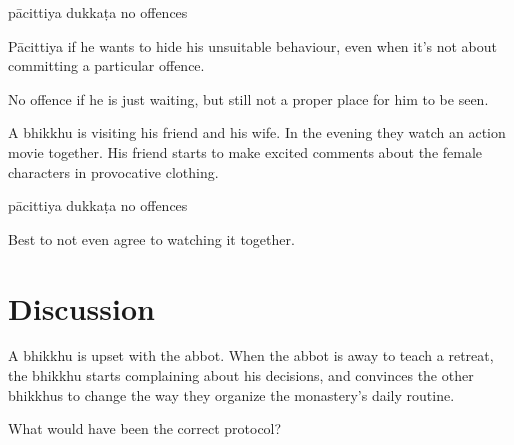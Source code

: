 \begin{exam}{\autoExamName}
\begin{problem*}
\begin{parts}
      \bigskip

      \begin{answers}{3}
        \bChoices
         pācittiya\eAns
         dukkaṭa\eAns
         no offences\eAns
        \eChoices
      \end{answers}

      \begin{solution}
        Pācittiya if he wants to hide his unsuitable behaviour, even when it's not about committing a particular offence.

        No offence if he is just waiting, but still not a proper place for him to be seen.
      \end{solution}

      \bigskip

      \item A bhikkhu is visiting his friend and his wife. In the evening they
      watch an action movie together. His friend starts to make excited comments
      about the female characters in provocative clothing.

      \bigskip

      \begin{answers}{3}
        \bChoices
         pācittiya\eAns
         dukkaṭa\eAns
         no offences\eAns
        \eChoices
      \end{answers}

      \begin{solution}
        Best to not even agree to watching it together.
      \end{solution}

    \end{parts}

  \end{problem*}

\end{exam}

\section*{Discussion}

A bhikkhu is upset with the abbot. When the abbot is away to teach a retreat,
the bhikkhu starts complaining about his decisions, and convinces the other
bhikkhus to change the way they organize the monastery's daily routine.

What would have been the correct protocol?
